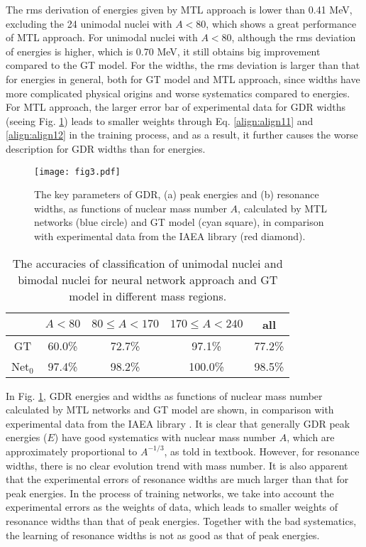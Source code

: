 \documentclass[twocolumn,showpacs,superscriptaddress,amsmath,amssymb,prc,preprintnumbers]{revtex4-1}
\begin{document}
The rms derivation of energies given by MTL approach is lower than 0.41 MeV, excluding the 24 unimodal nuclei with $A<80$, which shows a great performance of MTL approach. For unimodal nuclei with $A<80$, although the rms deviation of energies is higher, which is 0.70 MeV, it still obtains big improvement compared to the GT model. For the widths, the rms deviation is larger than that for energies in general, both for GT model and MTL approach, since widths have more complicated physical origins and worse systematics compared to energies. For MTL approach, the larger error bar of experimental data for GDR widths (seeing Fig. \ref{fig:fig3})  leads to smaller weights through Eq. \ref{align:align11} and \ref{align:align12} in the training process, and as a result, it further causes the worse description for GDR widths than for energies.


\begin{figure}[htbp]\setlength{\abovecaptionskip}{0.0em}
\texttt{[image: fig3.pdf]}
\caption{The key parameters of GDR, (a) peak energies and (b) resonance widths, as functions of nuclear mass number $A$, calculated by MTL networks (blue circle) and GT model \cite{RIPL3} (cyan square), in comparison with experimental data from the IAEA library \cite{Plujko2018} (red diamond). }\label{fig:fig3}
\end{figure}

\begin{table}[h]
\caption{ The accuracies of classification of unimodal nuclei and bimodal nuclei for neural network approach and GT model in different mass regions.} \label{tab:accuracy}
\begin{tabular}{ccccc}
\hline \hline
      &$A<80$ &$80\leq A<170$&$170\leq A<240$& all  \\
\hline
GT &  60.0\% & 72.7\% & 97.1\% & 77.2\%     \\
Net$_0$  & 97.4\% & 98.2\% & 100.0\% &  98.5\%     \\
\hline \hline
\end{tabular}
\end{table}

In Fig. \ref{fig:fig3}, GDR energies and widths as functions of nuclear mass number calculated by MTL networks and GT model are shown, in comparison with experimental data from the IAEA library \cite{Plujko2018}.  It is clear  that  generally GDR peak energies ($E$) have good systematics with nuclear mass number $A$, which are approximately proportional to $A^{-1/3}$, as told in textbook.  However, for resonance widths, there is no clear evolution trend with mass number. It is also apparent that the experimental errors of resonance widths are much larger than that for peak energies. In the process of training networks, we take into account the experimental errors as the weights of data, which leads to smaller weights of resonance widths than that of peak energies. Together with the bad systematics, the learning of resonance widths is not as good as that of peak energies.
\end{document}
